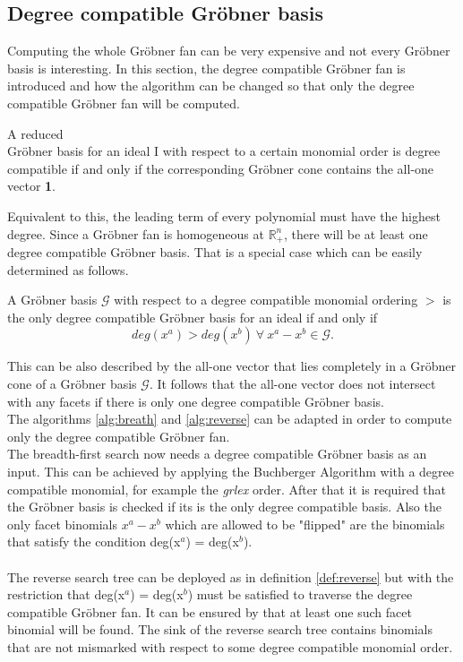 \subsection{Degree compatible Gröbner basis}
\label{subsec:degreecomp}
Computing the whole Gröbner fan can be very expensive and not every Gröbner basis is interesting.
In this section, the degree compatible Gröbner fan is introduced and how the algorithm can
be changed so that only the degree compatible Gröbner fan will be computed.\\
\begin{env_definition}
\cite{dueckpaper}
A reduced \\ Gröbner basis for an ideal I with respect to a certain monomial order is
degree compatible if and only if the corresponding Gröbner cone contains the all-one vector \textbf{1}.
\end{env_definition}
Equivalent to this, the leading term of every polynomial must have the highest degree.
Since a Gröbner fan is homogeneous at $\mathbb{R}^{n}_{+}$, there will be at least one degree compatible Gröbner basis.
That is a special case which can be easily determined as follows.

\begin{env_definition}
\cite{dueckpaper}
A Gröbner basis $\mathcal{G}$ with respect to a degree compatible monomial ordering $>$  is the only degree compatible Gröbner basis for an ideal if and only if
\[ deg(x^{a}) > deg(x^{b})~ \forall~ x^{a}-x^{b}\in \mathcal{G}. \] 
\end{env_definition}

This can be also described by the all-one vector that lies completely in a Gröbner cone of a Gröbner basis $\mathcal{G}$.
It follows that the all-one vector does not intersect with any facets if there is only one degree compatible Gröbner basis. \\

The algorithms \ref{alg:breath} and \ref{alg:reverse} can be adapted in order to compute only the degree compatible Gröbner fan.\\ 
The breadth-first search now needs a degree compatible Gröbner basis as an input. This can be achieved by applying the Buchberger Algorithm with a degree compatible monomial, for example the \textit{grlex} order. After that it is required that the Gröbner basis is checked if its is the only degree compatible basis. %
Also the only facet binomials $x^{a} - x^{b}$ which are allowed to be "flipped" are the binomials that satisfy the condition
deg(x$^{a}$) = deg(x$^{b}$). \\ \\
The reverse search tree can be deployed as in definition \ref{def:reverse} but with the restriction that deg(x$^{a}$) = deg(x$^{b}$) must be satisfied to traverse the degree compatible Gröbner fan.
It can be ensured by \cite{dueckpaper} that at least one such facet binomial will be found. 
The sink of the reverse search tree contains binomials that are not mismarked with respect to some degree compatible monomial order. 

